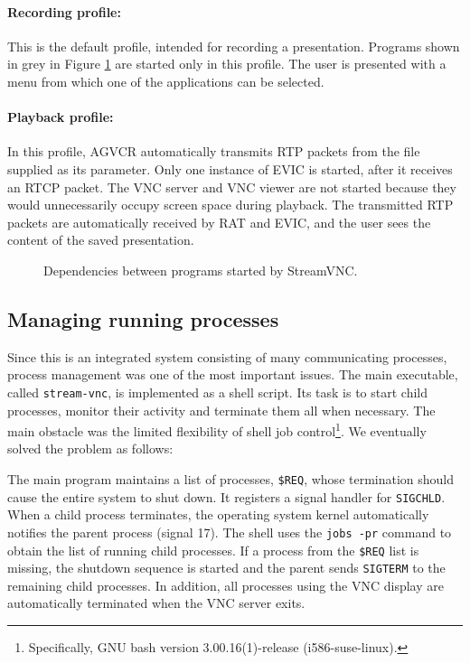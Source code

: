 \paragraph*{Recording profile:} This is the default profile, intended for recording a presentation. Programs shown in grey in Figure \ref{fig:SequenceStreamVNC} are started only in this profile. The user is presented with a menu from which one of the applications can be selected.

\paragraph*{Playback profile:}
In this profile, AGVCR automatically transmits RTP packets from the file supplied as its parameter. Only one instance of EVIC is started, after it receives an RTCP packet. The VNC server and VNC viewer are not started because they would unnecessarily occupy screen space during playback. The transmitted RTP packets are automatically received by RAT and EVIC, and the user sees the content of the saved presentation.

\begin{figure}
\centering

\caption{Dependencies between programs started by StreamVNC.}
\label{fig:SequenceStreamVNC}
\end{figure}

\subsection{Managing running processes}
Since this is an integrated system consisting of many communicating processes, process management was one of the most important issues. The main executable, called \verb|stream-vnc|, is implemented as a shell script. Its task is to start child processes, monitor their activity and terminate them all when necessary. The main obstacle was the limited flexibility of shell job control\footnote{Specifically, GNU bash version 3.00.16(1)-release (i586-suse-linux).}. We eventually solved the problem as follows:

The main program maintains a list of processes, \verb|$REQ|, whose termination should cause the entire system to shut down. It registers a signal handler for \verb|SIGCHLD|. When a child process terminates, the operating system kernel automatically notifies the parent process (signal 17). The shell uses the \verb|jobs -pr| command to obtain the list of running child processes. If a process from the \verb|$REQ| list is missing, the shutdown sequence is started and the parent sends \verb|SIGTERM| to the remaining child processes. In addition, all processes using the VNC display are automatically terminated when the VNC server exits.

